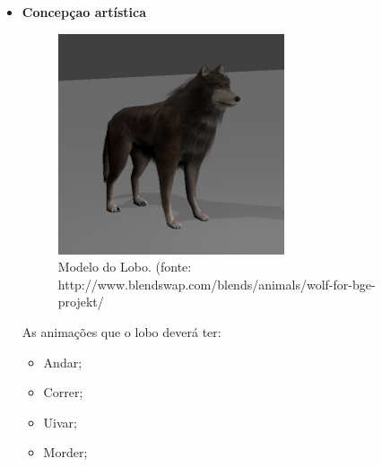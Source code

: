 \begin{itemize}
\newpage
\item {\bf Concepçao artística}

\begin{figure}[H]
 \centering
 \includegraphics[scale=1]{Imagens/lobo01.png}
 \caption{Modelo do Lobo. (fonte: http://www.blendswap.com/blends/animals/wolf-for-bge-projekt/}
\label{img:lobo}
\end{figure}


As animações que o lobo deverá ter:
\begin{itemize}
\item {Andar;}
\item {Correr;}
\item {Uivar;}
\item {Morder;}

\end{itemize}

\end{itemize}

